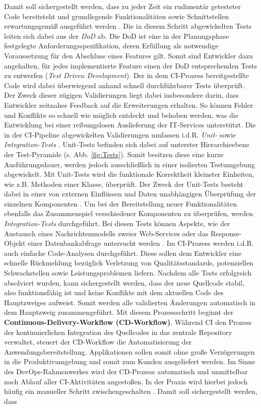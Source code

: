 \vspace*{-15mm}
Damit soll sichergestellt werden, dass zu jeder Zeit ein rudimentär getesteter Code bereitsteht und grundlegende Funktionalitäten sowie Schnittstellen erwartungsgemäß ausgeführt werden \cite[19]{Halstenberg.2020}. Die in diesem Schritt abgewickelten Tests leiten sich dabei aus der \textit{\ac{DoD}} ab. Die DoD ist eine in der Planungsphase festgelegte Anforderungsspezifikation, deren Erfüllung als notwendige Voraussetzung für den Abschluss eines Features gilt. Somit sind Entwickler dazu angehalten, für jedes implementierte Feature einen der DoD entsprechenden Tests zu entwerfen (\textit{Test Driven Development}). Der in dem CI-Prozess bereitgestellte Code wird dabei überwiegend anhand schnell durchführbarer Tests überprüft. Der Zweck dieser zügigen Validierungen liegt dabei insbesondere darin, dass Entwickler zeitnahes Feedback auf die Erweiterungen erhalten. So können Fehler und Konflikte so schnell wie möglich entdeckt und behoben werden, was die Entwicklung bei einer reibungslosen Auslieferung der IT-Services unterstützt. Die in der CI-Pipeline abgewickelten Validierungen umfassen i.d.R. \textit{Unit-} sowie \textit{Integration-Tests} \cite[Kap. 1.2]{Labouardy.2021}. Unit-Tests befinden sich dabei auf unterster Hierarchieebene der Test-Pyramide (s. Abb. \ref{fig:Tests}). Somit besitzen diese eine kurze Ausführungsdauer, werden jedoch ausschließlich in einer isolierten Testumgebung abgewickelt. Mit Unit-Tests wird die funktionale Korrektheit kleinster Einheiten, wie z.B. Methoden einer Klasse, über\-prüft. Der Zweck der Unit-Tests besteht dabei in einer von externen Einflüssen und Daten unabhängigen Überprüfung der einzelnen Komponenten \cite[Kap. 2]{Hambling.2015}. Um bei der Bereitstellung neuer Funktionalitäten ebenfalls das Zusammenspiel verschiedener Komponenten zu überprüfen, werden \textit{Integration-Tests} durchgeführt. Bei diesen Tests können Aspekte, wie der Austausch eines Nachrichtenmodells zweier Web-Services oder das Response-Objekt einer Datenbankabfrage untersucht werden \cite[Kap. 2]{Hambling.2015}. Im CI-Prozess werden i.d.R. auch einfache Code-Analysen durchgeführt. Diese sollen dem Entwickler eine schnelle Rückmeldung bezüglich Verletzung von Qualitätsstandards, potenziellen Schwachstellen sowie Leistungsproblemen liefern. Nachdem alle Tests erfolgreich absolviert wurden, kann sichergestellt werden, dass der neue Quellcode stabil, also funktionsfähig ist und keine Konflikte mit dem aktuellen Code des Hauptzweiges aufweist. Somit werden alle validierten Änderungen automatisch in dem Hauptzweig zusammengeführt. Mit diesem Prozessschritt beginnt der \textbf{Continuous-Delivery-Workflow (\acs{CD}-Workflow)}.  Während CI den Prozess der kontinuierlichen Integration des Quellcodes in das zentrale Repository verwaltet, steuert der CD-Workflow die Automatisierung der Anwendungsbereitstellung. Applikationen sollen somit ohne große Verzögerungen in die Produktivumgebung und somit zum Kunden ausgeliefert werden. Im Sinne des DevOps-Rahmenwerkes wird der CD-Prozess automatisch und unmittelbar nach Ablauf aller CI-Aktivitäten angestoßen. In der Praxis wird hierbei jedoch häufig ein manueller Schritt zwischengeschalten \cite[20]{Halstenberg.2020}. Damit soll sichergestellt werden, dass 